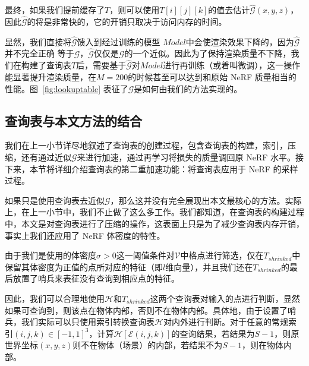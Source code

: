 最终，如果我们提前缓存了$T$，则可以使用$T\left[i \right]\left[j \right]\left[k \right]$的值去估计$\hat{\mathcal{G}}\left(x, y, z\right)$，因此$\hat{\mathcal{G}}$的将是非常快的，它的开销只取决于访问内存的时间。

显然，我们直接将$\hat{\mathcal{G}}$馈入到经过训练的模型 $Model$中会使渲染效果下降的，因为$\hat{\mathcal{G}}$并不完全正确
等于$\mathcal{G}$，$\hat{\mathcal{G}}$仅仅是$\mathcal{G}$的一个近似。因此为了保持渲染质量不下降，我们在构建了查询表$T$后，需要基于$\hat{\mathcal{G}}$对$Model$进行再训练（或着叫微调），这一操作能显著提升渲染质量，在$M = 200$的时候甚至可以达到和原始 NeRF 质量相当的性能。图~\ref{fig:lookuptable} 表征了$\mathcal{G}$是如何由我们的方法实现的。

\subsection{查询表与本文方法的结合}
我们在上一小节详尽地叙述了查询表的创建过程，包含查询表的构建，索引，压缩，还有通过近似$\mathcal{G}$来进行加速，通过再学习将损失的质量调回原 NeRF 水平。接下来，本节将详细介绍查询表的第二重加速功能：将查询表应用于 NeRF 的采样过程。

如果只是使用查询表去近似$\mathcal{G}$，那么这并没有完全展现出本文最核心的方法。实际上，在上一小节中，我们不止做了这么多工作。我们都知道，在查询表的构建过程中，本文是对查询表进行了压缩的操作，这表面上只是为了减少查询表内存开销，事实上我们还应用了 NeRF 体密度的特性。

由于我们是使用的体密度$\sigma > 0$这一阈值条件对$\mathcal{V}$中格点进行筛选，仅在$T_{shrinked}$中保留其体密度为正值的点所对应的特征（即$l$维向量），并且我们还在$T_{shrinked}$的最后放置了哨兵来表征没有查询到相应点的特征。

因此，我们可以合理地使用$\mathcal{H}$和$T_{shrinked}$这两个查询表对输入的点进行判断，显然如果可查询到，则该点在物体内部，否则不在物体内部。具体地，由于设置了哨兵，我们实际可以只使用索引转换查询表$\mathcal{H}$对内外进行判断。对于任意的常规索引$\left(i, j, k\right) \in \left[-1, 1\right]^3$，计算$\mathcal{H}\left[\mathcal{E}\left(i, j, k\right)\right]$的查询结果，若结果为$S - 1$，则原世界坐标$\left(x, y, z\right)$则不在物体（场景）的内部，若结果不为$S - 1$，则在物体内部。

